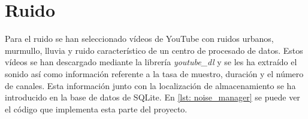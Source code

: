 \section{Ruido}
Para el ruido se han seleccionado vídeos de YouTube con ruidos urbanos, murmullo, lluvia y ruido característico de un centro de procesado de datos. Estos vídeos se han descargado mediante la librería \textit{youtube\_dl} y se les ha extraído el sonido así como información referente a la tasa de muestro, duración y el número de canales. Esta información junto con la localización de almacenamiento se ha introducido en la base de datos de SQLite. En \ref{lst: noise_manager} se puede ver el código que implementa esta parte del proyecto.

